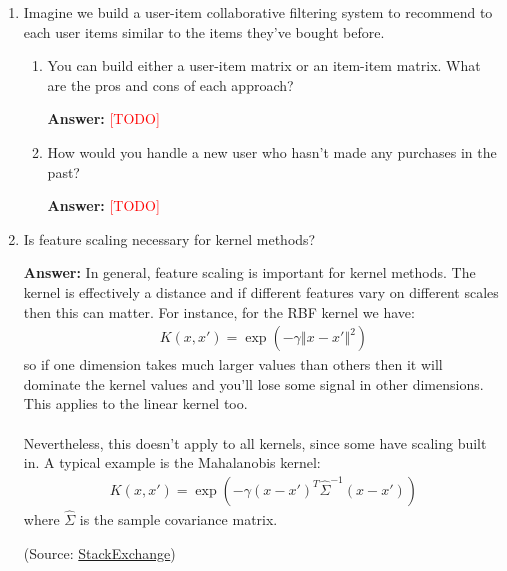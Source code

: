 \documentclass{article}
\newenvironment{QandA}{\begin{enumerate}[label=\arabic*.]}{\end{enumerate}}
\newenvironment{InnerQandA}{\begin{enumerate}[label=\roman*.]}{\end{enumerate}}
\newenvironment{answer}{\par\normalfont \textbf{Answer:}}{}
\newcommand{\todo}{\textcolor{red}{[TODO]}}
\begin{document}
\begin{QandA}
    \item Imagine we build a user-item collaborative filtering system to recommend to each user items similar to the items they’ve bought before.
    \begin{InnerQandA}
        \item You can build either a user-item matrix or an item-item matrix. What are the pros and cons of each approach?
        \begin{answer}
            \todo 
        \end{answer}

        \item How would you handle a new user who hasn’t made any purchases in the past?
        \begin{answer}
            \todo
        \end{answer}
    \end{InnerQandA}

    \item Is feature scaling necessary for kernel methods?
    \begin{answer}
        In general, feature scaling is important for kernel methods. The kernel is effectively a distance and if different features vary on different scales then this can matter. For instance, for the RBF kernel we have:
        \begin{align*}
            K(x, x') = \exp \left(-\gamma \left\Vert x - x'\right\Vert^2 \right)
        \end{align*}
        so if one dimension takes much larger values than others then it will dominate the kernel values and you'll lose some signal in other dimensions. This applies to the linear kernel too. \\\\
        Nevertheless, this doesn't apply to all kernels, since some have scaling built in. A typical example is the Mahalanobis kernel:
        \begin{align*}
            K(x, x') = \exp \left(-\gamma (x - x')^T\hat{\Sigma}^{-1}(x-x') \right)
        \end{align*}
        where $\hat{\Sigma}$ is the sample covariance matrix.

        (Source: \href{https://stats.stackexchange.com/questions/305906/feature-scaling-in-svm-does-it-depend-on-the-kernel}{StackExchange})
    \end{answer}


\end{QandA}
\end{document}
